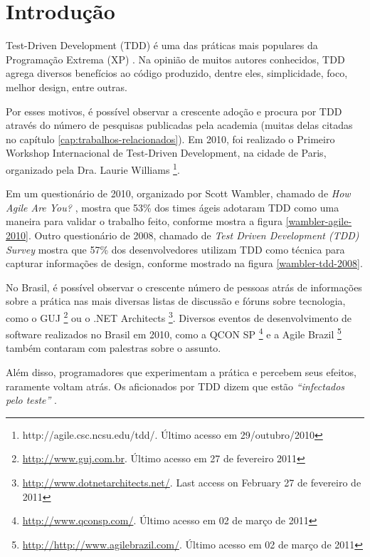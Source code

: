 \chapter{Introdução}
\label{cap:introducao}

Test-Driven Development (TDD) é uma das práticas mais populares da Programação
Extrema (XP) \cite{XPExplained}. 
Na opinião de muitos autores conhecidos, TDD agrega diversos benefícios ao
código produzido, dentre eles, simplicidade, foco, melhor design, entre outras.

Por esses motivos, é possível observar a crescente adoção e procura por TDD
através do número de pesquisas publicadas pela academia (muitas delas citadas no
capítulo \ref{cap:trabalhos-relacionados}). Em 2010, foi realizado o Primeiro
Workshop Internacional de Test-Driven Development, na cidade de Paris, 
organizado pela Dra. Laurie Williams \footnote{http://agile.csc.ncsu.edu/tdd/. 
Último acesso em 29/outubro/2010}.

Em um questionário de 2010, organizado por Scott Wambler, chamado de \textit{How
Agile Are You?} \cite{wambler-survey-agile}, mostra que 53\% dos times ágeis
adotaram TDD como uma maneira para validar o trabalho feito, conforme mostra a 
figura \ref{wambler-agile-2010}. Outro questionário de 2008, 
chamado de \textit{Test Driven Development (TDD) Survey}
\cite{wambler-survey-tdd}  mostra que 57\% dos desenvolvedores utilizam TDD como
técnica para capturar informações de design, conforme mostrado na figura 
\ref{wambler-tdd-2008}. 

No Brasil, é possível observar o crescente número de pessoas atrás de
informações sobre a prática nas mais diversas listas de discussão e fóruns sobre
tecnologia, como o GUJ \footnote{\url{http://www.guj.com.br}.
Último acesso em 27 de fevereiro 2011} ou o .NET Architects 
\footnote{\url{http://www.dotnetarchitects.net/}. Last access on February
27 de fevereiro de 2011}. Diversos eventos de desenvolvimento de
software realizados no Brasil em 2010, como a QCON SP
\footnote{\url{http://www.qconsp.com/}. Último acesso em 02 de março de 2011} e
a Agile Brazil \footnote{\url{http://http://www.agilebrazil.com/}. Último acesso
em 02 de março de 2011} também contaram com palestras sobre o assunto.

Além disso, programadores que experimentam a prática e percebem seus
efeitos, raramente voltam atrás. Os aficionados por TDD dizem que estão
\textit{``infectados pelo teste''} \cite{tdd-fearless}.


